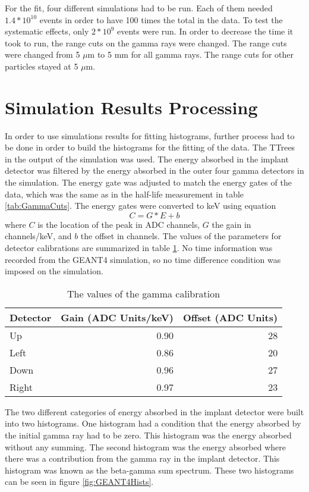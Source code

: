\documentclass[../MaxHughesThesis.tex]{subfiles}
\begin{document}
For the fit, four different simulations had to be run.
Each of them needed $1.4 * 10^{10}$ events in order to have 100 times the total in the data.
To test the systematic effects, only $2 * 10^{9}$ events were run.
In order to decrease the time it took to run, the range cuts on the gamma rays were changed.
The range cuts were changed from 5 $\mu$m to 5 mm for all gamma rays.
The range cuts for other particles stayed at 5 $\mu$m.

\section{Simulation Results Processing}
In order to use simulations results for fitting histograms, further process had to be done in order to build the histograms for the fitting of the data. 
The TTrees in the output of the simulation was used. 
The energy absorbed in the implant detector was filtered by the energy absorbed in the outer four gamma detectors in the simulation.
The energy gate was adjusted to match the energy gates of the data, which was the same as in the half-life measurement in table \ref{tab:GammaCuts}.
The energy gates were converted to keV using equation
\begin{equation}
	C = G * E + b
	\label{eq:cal}
\end{equation}
where $C$ is the location of the peak in ADC channels, $G$ the gain in channels/keV, and $b$ the offset in channels.
The values of the parameters for detector calibrations are summarized in table \ref{tab:gammadetcal}.
No time information was recorded from the GEANT4 simulation, so no time difference condition was imposed on the simulation. 

\begin{table}[!hbt]
	\centering
	\caption{The values of the gamma calibration} 
		\begin{tabular}{lrr}
		Detector & Gain (ADC Units/keV) & Offset (ADC Units) \\ \hline
		Up & 0.90 & 28 \\
		Left & 0.86 & 20 \\
		Down & 0.96 & 27 \\
		Right & 0.97 & 23 		
		\end{tabular}
		\label{tab:gammadetcal}
\end{table}
The two different categories of energy absorbed in the implant detector were built into two histograms. 
One histogram had a condition that the energy absorbed by the initial gamma ray had to be zero.
This histogram was the energy absorbed without any summing.
The second histogram was the energy absorbed where there was a contribution from the gamma ray in the implant detector.
This histogram was known as the beta-gamma sum spectrum.
These two histograms can be seen in figure \ref{fig:GEANT4Hists}.
\end{document}
